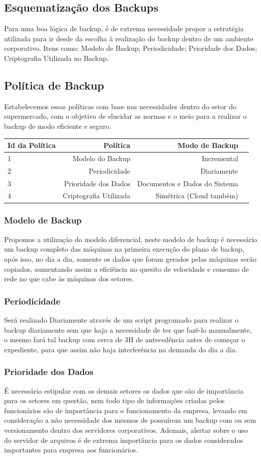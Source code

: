 \documentclass[12pt]{article}
\begin{document}
\subsection{Esquematização dos Backups}
Para uma boa lógica de backup, é de extrema necessidade propor a estratégia utilizada para ir desde da escolha à realização do backup dentro de um ambiente corporativo. Itens como: Modelo de Backup; Periodicidade; Prioridade dos Dados; Criptografia Utilizada no Backup.
\subsection{Política de Backup}
Estabelecemos essas políticas com base nas necessidades dentro do setor do supermercado, com o objetivo de elucidar as normas e o meio para a realizar o backup de modo eficiente e seguro.
\begin{center}
\begin{tabular}{| l | r | r | r |}
\hline 
Id da Política & Política & Modo de Backup\\
\hline
1 & Modelo do Backup & Incremental\\
2 & Periodicidade & Diariamente\\
3 & Prioridade dos Dados & Documentos e Dados do Sistema\\
4 & Criptografia Utilizada & Simétrica (Cloud também)\\
\hline
\end{tabular}
\end{center}
\subsubsection{Modelo de Backup}
Propomos a utilização do modelo diferencial, neste modelo de backup é necessário um backup completo das máquinas na primeira execução do plano de backup, após isso, no dia a dia, somente os dados que foram gerados pelas máquinas serão copiados, aumentando assim a eficiência no quesito de velocidade e consumo de rede no que cabe às máquinas dos setores.
\subsubsection{Periodicidade}
Será realizado Diariamente através de um script programado para realizar o backup diariamente sem que haja a necessidade de ter que fazê-lo manualmente, o mesmo fará tal backup com cerca de 3H de antecedência antes de começar o expediente, para que assim não haja interferência na demanda do dia a dia. 
\subsubsection{Prioridade dos Dados}
É necessário estipular com os demais setores os dados que são de importância para os setores em questão, nem todo tipo de informações criadas pelos funcionários são de importância para o funcionamento da empresa, levando em consideração a não necessidade dos mesmos de possuírem um backup com ou sem versionamento dentro dos servidores corporativos. Ademais, alertar sobre o uso do servidor de arquivos é de extrema importância para os dados considerados importantes para empresa aos funcionários.
\end{document}
